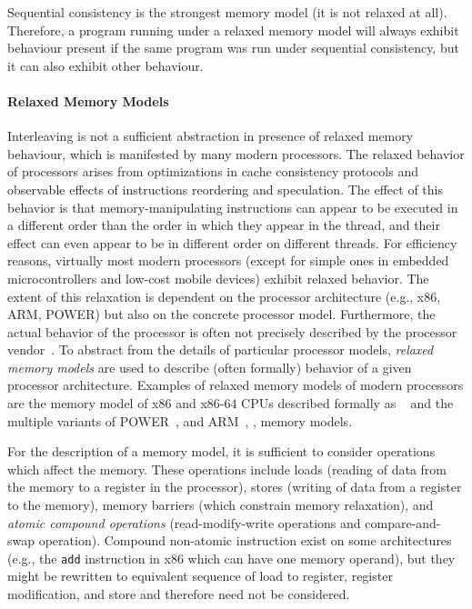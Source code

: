 Sequential consistency is the strongest memory model (it is not relaxed at all).
Therefore, a program running under a relaxed memory model will always exhibit
behaviour present if the same program was run under sequential consistency, but
it can also exhibit other behaviour.

\paragraph{Relaxed Memory Models}

Interleaving is not a sufficient abstraction in presence of relaxed memory
behaviour, which is manifested by many modern processors.
The relaxed behavior of processors arises from optimizations in cache
consistency protocols and observable effects of instructions reordering and
speculation.
The effect of this behavior is that memory-manipulating instructions can appear
to be executed in a different order than the order in which they appear in the
thread, and their effect can even appear to be in different order on different
threads.
For efficiency reasons, virtually most modern processors (except for simple
ones in embedded microcontrollers and low-cost mobile devices) exhibit relaxed
behavior.
The extent of this relaxation is dependent on the processor architecture (e.g.,
x86, ARM, POWER) but also on the concrete processor model.
Furthermore, the actual behavior of the processor is often not precisely
described by the processor vendor~.
To abstract from the details of particular processor models, \emph{relaxed
memory models} are used to describe (often formally) behavior of a given
processor architecture.
Examples of relaxed memory models of modern processors are the memory model of
x86 and x86-64 CPUs described formally as \xtso~ and the multiple
variants of POWER~, and
ARM~, ,  memory models.

For the description of a memory model, it is sufficient to consider operations
which affect the memory.
These operations include loads (reading of data from the memory to a register
in the processor), stores (writing of data from a register to the memory),
memory barriers (which constrain memory relaxation), and \emph{atomic compound
operations} (read-modify-write operations and compare-and-swap operation).
Compound non-atomic instruction exist on some architectures (e.g., the
\texttt{add} instruction in x86 which can have one memory operand), but they
might be rewritten to equivalent sequence of load to register, register
modification, and store and therefore need not be considered.

